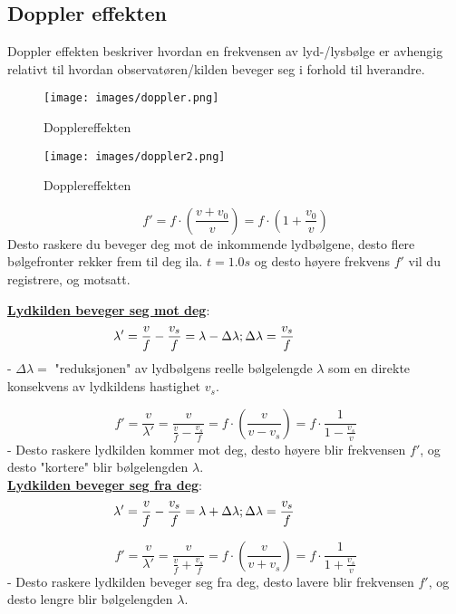 \documentclass[12pt]{article}
\begin{document}
\subsection{Doppler effekten}
Doppler effekten beskriver hvordan en frekvensen av lyd-/lysbølge er avhengig relativt til hvordan observatøren/kilden beveger seg i forhold til hverandre. 
\begin{figure} [H]
    \centering
    \texttt{[image: images/doppler.png]}
    \caption{Dopplereffekten}
\end{figure}
\begin{figure} [H]
    \centering
    \texttt{[image: images/doppler2.png]}
    \caption{Dopplereffekten}
\end{figure}
$$f' = f\cdot (\frac{v+v_0}{v}) = f\cdot (1+\frac{v_0}{v})$$
Desto raskere du beveger deg mot de inkommende lydbølgene, desto flere bølgefronter rekker frem til deg ila. $t=1.0s$ og desto høyere frekvens $f'$ vil du registrere, og motsatt.

\underline{\textbf{Lydkilden beveger seg mot deg}}:
$$\lambda' = \frac{v}{f}-\frac{v_s}{f} = \lambda-\Delta\lambda; \hspace{5em \Delta\lambda = \frac{v_s}{f}}$$
- $\Delta \lambda =$ "reduksjonen" av lydbølgens reelle bølgelengde $\lambda$ som en direkte konsekvens av lydkildens hastighet $v_s$.

$$f' = \frac{v}{\lambda'} = \frac{v}{\frac{v}{f}-\frac{v_s}{f}} = f\cdot (\frac{v}{v-v_s}) = f\cdot \frac{1}{1-\frac{v_s}{v}}$$
- Desto raskere lydkilden kommer mot deg, desto høyere blir frekvensen $f'$, og desto "kortere" blir bølgelengden $\lambda$.\\
\bigskip
\bigskip
\underline{\textbf{Lydkilden beveger seg fra deg}}:
$$\lambda' = \frac{v}{f}-\frac{v_s}{f} = \lambda +\Delta\lambda; \hspace{5em \Delta\lambda = \frac{v_s}{f}}$$

$$f' = \frac{v}{\lambda'} = \frac{v}{\frac{v}{f}+\frac{v_s}{f}} = f\cdot (\frac{v}{v+v_s}) = f\cdot \frac{1}{1+\frac{v_s}{v}}$$
- Desto raskere lydkilden beveger seg fra deg, desto lavere blir frekvensen $f'$, og desto lengre blir bølgelengden $\lambda$.
\end{document}
